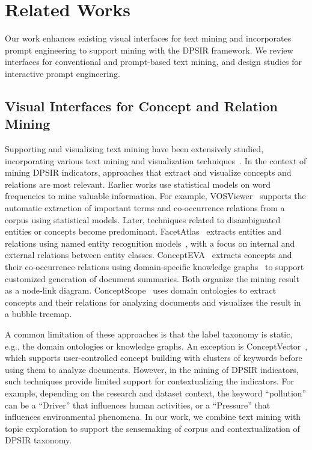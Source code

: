 
\vspace*{-0.2cm}
\section{Related Works}
Our work enhances existing visual interfaces for text mining and incorporates prompt engineering to support mining with the DPSIR framework.
We review interfaces for conventional and prompt-based text mining, and design studies for interactive prompt engineering.

\vspace*{-0.15cm}
\subsection{Visual Interfaces for Concept and Relation Mining}
Supporting and visualizing text mining have been extensively studied, incorporating various text mining and visualization techniques~\cite{liu2019bridging}. 
In the context of mining DPSIR indicators, approaches that extract and visualize concepts and relations are most relevant.
Earlier works use statistical models on word frequencies to mine valuable information.
For example, VOSViewer~\cite{wong2018vosviewer} supports the automatic extraction of important terms and co-occurrence relations from a corpus using statistical models. 
Later, techniques related to disambiguated entities or concepts become predominant.
FacetAtlas~\cite{cao2010facetatlas} extracts entities and relations using named entity recognition models~\cite{finkel2005ner}, with a focus on internal and external relations between entity classes. 
ConceptEVA~\cite{zhang2023concepteva} extracts concepts and their co-occurrence relations using domain-specific knowledge graphs~\cite{mendes2011dbpediaspotlight} to support customized generation of document summaries.
Both organize the mining result as a node-link diagram.
ConceptScope~\cite{zhang2021conceptscope} uses domain ontologies to extract concepts and their relations for analyzing documents and visualizes the result in a bubble treemap.

A common limitation of these approaches is that the label taxonomy is static, e.g., the domain ontologies or knowledge graphs.
An exception is ConceptVector~\cite{park2018conceptvector}, which supports user-controlled concept building with clusters of keywords before using them to analyze documents.
However, in the mining of DPSIR indicators, such techniques provide limited support for contextualizing the indicators. 
For example, depending on the research and dataset context, the keyword ``pollution'' can be a ``Driver'' that influences human activities, or a ``Pressure'' that influences environmental phenomena. 
In our work, we combine text mining with topic exploration to support the sensemaking of corpus and contextualization of DPSIR taxonomy.

